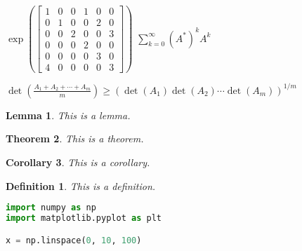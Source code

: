 \documentclass[12pt]{article}
\newtheorem{theorem}{Theorem}
\newtheorem{corollary}[theorem]{Corollary}
\newtheorem{lemma}[theorem]{Lemma}
\newtheorem{definition}{Definition}
\begin{document}
$
\exp \left(\left[\begin{array}{llllll}
1 & 0 & 0 & 1 & 0 & 0 \\
0 & 1 & 0 & 0 & 2 & 0 \\
0 & 0 & 2 & 0 & 0 & 3 \\
0 & 0 & 0 & 2 & 0 & 0 \\
0 & 0 & 0 & 0 & 3 & 0 \\
4 & 0 & 0 & 0 & 0 & 3
\end{array}\right]\right)
$
\newline
$
\sum_{k=0}^{\infty}\left(A^*\right)^k A^k
$
\newline

$
\operatorname{det}\left(\frac{A_1+A_2+\cdots+A_m}{m}\right) \geq\left(\operatorname{det}\left(A_1\right) \operatorname{det}\left(A_2\right) \cdots \operatorname{det}\left(A_m\right)\right)^{1 / m}
$

\begin{lemma}
This is a lemma.
\end{lemma}

\begin{theorem}
This is a theorem.
\end{theorem}

\begin{corollary}
This is a corollary.
\end{corollary}

\begin{definition}
This is a definition.
\end{definition}

\begin{lstlisting}[language=Python]
import numpy as np
import matplotlib.pyplot as plt

x = np.linspace(0, 10, 100)

\end{lstlisting}
\end{document}
